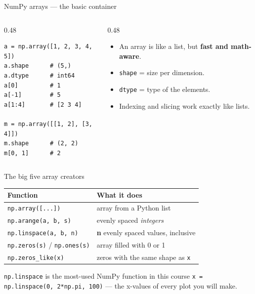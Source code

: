 \documentclass[aspectratio=169]{beamer}
\begin{document}
\begin{frame}[fragile]{NumPy arrays --- the basic container}
  \begin{columns}[T]
    \begin{column}{0.48\textwidth}
      \begin{lstlisting}
a = np.array([1, 2, 3, 4, 5])
a.shape      # (5,)
a.dtype      # int64
a[0]         # 1
a[-1]        # 5
a[1:4]       # [2 3 4]

m = np.array([[1, 2], [3, 4]])
m.shape      # (2, 2)
m[0, 1]      # 2
      \end{lstlisting}
    \end{column}
    \begin{column}{0.48\textwidth}
      \begin{itemize}
        \item An array is like a list, but \textbf{fast and math-aware}.
        \item \texttt{shape} = size per dimension.
        \item \texttt{dtype} = type of the elements.
        \item Indexing and slicing work exactly like lists.
      \end{itemize}
    \end{column}
  \end{columns}
\end{frame}

\begin{frame}{The big five array creators}
  \begin{table}
    \small
    \begin{tabular}{@{}ll@{}}
      \toprule
      Function & What it does \\
      \midrule
      \texttt{np.array([...])} & array from a Python list \\
      \texttt{np.arange(a, b, s)} & evenly spaced \emph{integers} \\
      \texttt{np.linspace(a, b, n)} & \textbf{n} evenly spaced values, inclusive \\
      \texttt{np.zeros(s)} / \texttt{np.ones(s)} & array filled with 0 or 1 \\
      \texttt{np.zeros\_like(x)} & zeros with the same shape as \texttt{x} \\
      \bottomrule
    \end{tabular}
  \end{table}
  \vspace{0.3cm}
  \begin{alertblock}{\texttt{np.linspace} is the most-used NumPy function in this course}
    \texttt{x = np.linspace(0, 2*np.pi, 100)} --- the x-values of every plot you will make.
  \end{alertblock}
\end{frame}
\end{document}
